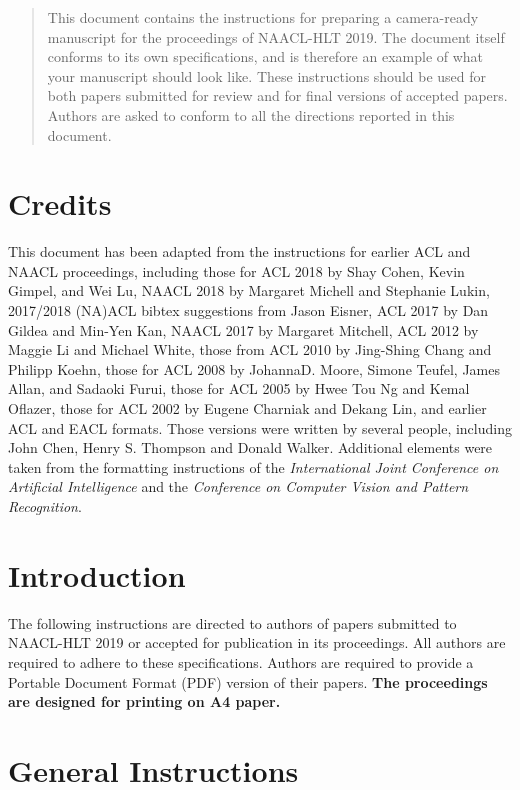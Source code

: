 \documentclass[11pt,a4paper]{article}
\begin{document}
\iffalse

\begin{abstract}
  This document contains the instructions for preparing a camera-ready
  manuscript for the proceedings of NAACL-HLT 2019. The document itself
  conforms to its own specifications, and is therefore an example of
  what your manuscript should look like. These instructions should be
  used for both papers submitted for review and for final versions of
  accepted papers.  Authors are asked to conform to all the directions
  reported in this document.
\end{abstract}

\section{Credits}

This document has been adapted from the instructions
for earlier ACL and NAACL proceedings,
including 
those for ACL 2018 by Shay Cohen, Kevin Gimpel, and Wei Lu, 
NAACL 2018 by Margaret Michell and Stephanie Lukin,
2017/2018 (NA)ACL bibtex suggestions from Jason Eisner,
ACL 2017 by Dan Gildea and Min-Yen Kan, 
NAACL 2017 by Margaret Mitchell, 
ACL 2012 by Maggie Li and Michael White, 
those from ACL 2010 by Jing-Shing Chang and Philipp Koehn, 
those for ACL 2008 by JohannaD. Moore, Simone Teufel, James Allan, and Sadaoki Furui, 
those for ACL 2005 by Hwee Tou Ng and Kemal Oflazer, 
those for ACL 2002 by Eugene Charniak and Dekang Lin, 
and earlier ACL and EACL formats.
Those versions were written by several
people, including John Chen, Henry S. Thompson and Donald
Walker. Additional elements were taken from the formatting
instructions of the {\em International Joint Conference on Artificial
  Intelligence} and the \emph{Conference on Computer Vision and
  Pattern Recognition}.

\section{Introduction}

The following instructions are directed to authors of papers submitted
to NAACL-HLT 2019 or accepted for publication in its proceedings. All
authors are required to adhere to these specifications. Authors are
required to provide a Portable Document Format (PDF) version of their
papers. \textbf{The proceedings are designed for printing on A4
paper.}

\section{General Instructions}
\end{document}
